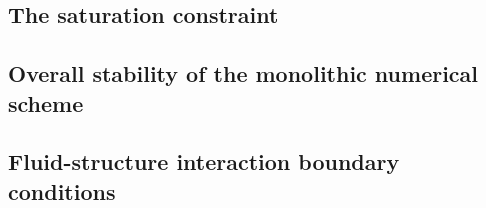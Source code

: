 \subsection{The saturation constraint}
\subsection{Overall stability of the monolithic numerical scheme}
\subsection{Fluid-structure interaction boundary conditions}




%

